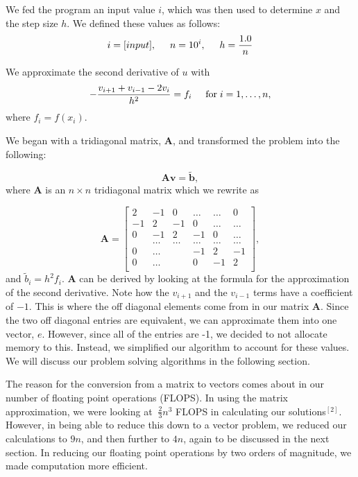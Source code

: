 \documentclass{article}
\begin{document}
We fed the program an input value $i$, which was then used to determine $x$ and the step size $h$. We defined these values as follows:
\begin{equation*}
i = [input], \hspace{0.5cm} n = 10^{i},\hspace{0.5cm}  h = \frac{1.0}{n}
\end{equation*}

We  approximate the second derivative of $u$ with
\begin{equation*}
-\frac{v_{i+1}+v_{i-1}-2v_i}{h^2} = f_i  \hspace{0.5cm} \mathrm{for} \hspace{0.1cm} i=1,\dots, n,
\end{equation*}
where $f_i=f(x_i)$.



We began with a tridiagonal matrix, $\mathbf{A}$, and transformed the problem into the following:

\begin{equation*}
\mathbf{A}\mathbf{v} = \tilde{\mathbf{b}},
\end{equation*}
where $\mathbf{A}$ is an $n\times n$  tridiagonal matrix which we rewrite as

\[
\mathbf{A} = \begin{bmatrix}
2& -1& 0 &\dots   & \dots &0 \\
-1 & 2 & -1 &0 &\dots &\dots \\
0&-1 &2 & -1 & 0 & \dots \\
& \dots   & \dots &\dots   &\dots & \dots \\
0&\dots   &  &-1 &2& -1 \\
0&\dots    &  & 0  &-1 & 2 \\
\end{bmatrix},
\]
and $\tilde{b}_i=h^2f_i$.  $\mathbf{A}$ can be derived by looking at the formula for the approximation of the second derivative. Note how the $v_{i+1}$ and the $v_{i-1}$ terms have a coefficient of $-1$. This is where the off diagonal elements come from in our matrix $\mathbf{A}$. Since the two off diagonal entries are equivalent, we can approximate them into one vector, $e$. However, since all of the entries are -1, we decided to not allocate memory to this. Instead, we simplified our algorithm to account for these values. We will discuss our problem solving algorithms in the following section.

The reason for the conversion from a matrix to vectors comes about in our number of floating point operations (FLOPS). In using the matrix approximation, we were looking at $~\frac{2}{3}n^{3}$ FLOPS in calculating our solutions$^{[2]}$. However, in being able to reduce this down to a vector problem, we reduced our calculations to $9n$, and then further to $4n$, again to be discussed in the next section. In reducing our floating point operations by two orders of magnitude, we made computation more efficient. 
\end{document}
